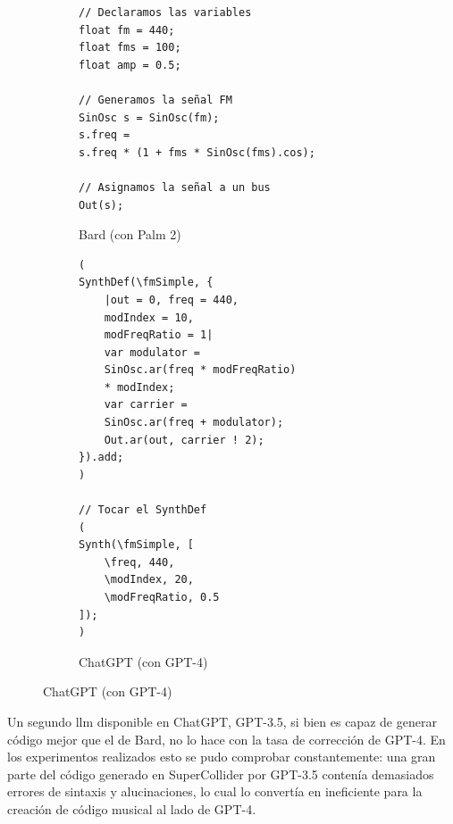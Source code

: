 \begin{figure}[h]
    \caption[Respuesta de {Bard} y {ChatGPT} a un mismo prompt]{(\textbf{a}) Respuesta de {Bard} y (\textbf{b}) {ChatGPT} a un mismo prompt.}
    \centering
    \begin{subfigure}{.48\textwidth}
    \centering
    \begin{lstlisting}[style=SuperCollider-IDE, basicstyle=\footnotesize\ttfamily, numbers=none]
// Declaramos las variables
float fm = 440;
float fms = 100;
float amp = 0.5; 

// Generamos la señal FM
SinOsc s = SinOsc(fm);
s.freq = 
s.freq * (1 + fms * SinOsc(fms).cos);

// Asignamos la señal a un bus
Out(s);
    \end{lstlisting}
    \caption{Bard (con Palm 2)}
    \end{subfigure}\hfill
    \begin{subfigure}{.48\textwidth}
    \centering
    \begin{lstlisting}[style=SuperCollider-IDE, basicstyle=\footnotesize\ttfamily, numbers=none]
(
SynthDef(\fmSimple, {
    |out = 0, freq = 440, 
    modIndex = 10,
    modFreqRatio = 1|
    var modulator = 
    SinOsc.ar(freq * modFreqRatio) 
    * modIndex;
    var carrier = 
    SinOsc.ar(freq + modulator);
    Out.ar(out, carrier ! 2);
}).add;
)

// Tocar el SynthDef
(
Synth(\fmSimple, [
    \freq, 440,   
    \modIndex, 20, 
    \modFreqRatio, 0.5
]);
)
    \end{lstlisting}
    \caption{ChatGPT (con GPT-4)}
    \end{subfigure}
    \source{\propio}
    \label{fig:GPT4_correction_comparation}
\end{figure}


Un segundo \gls{llm} disponible en ChatGPT, GPT-3.5, si bien es capaz de generar código mejor que el de Bard, no lo hace con la tasa de corrección de GPT-4. En los experimentos realizados esto se pudo comprobar constantemente: una gran parte del código generado en SuperCollider por GPT-3.5 contenía demasiados errores de sintaxis y alucinaciones, lo cual lo convertía en ineficiente para la creación de código musical al lado de GPT-4.


